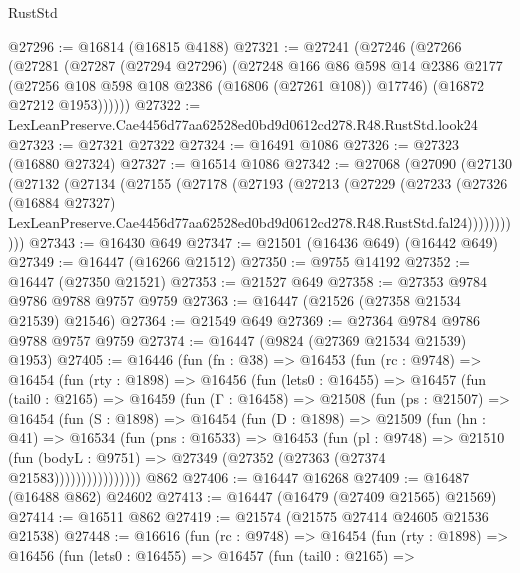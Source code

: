 \begin{lexlean}{RustStd}
\begin{coremodule}
@27296 := @16814 (@16815 @4188)
@27321 := @27241
    (@27246
      (@27266
        (@27281
          (@27287
            (@27294 @27296)
            (@27248
              @166
              @86
              @598
              @14
              @2386
              @2177
              (@27256 @108 @598 @108 @2386 (@16806 (@27261 @108)) @17746)
              (@16872 @27212 @1953))))))
@27322 := LexLeanPreserve.Cae4456d77aa62528ed0bd9d0612cd278.R48.RustStd.look24
@27323 := @27321 @27322
@27324 := @16491 @1086
@27326 := @27323 (@16880 @27324)
@27327 := @16514 @1086
@27342 := @27068
    (@27090
      (@27130
        (@27132
          (@27134
            (@27155
              (@27178
                (@27193
                  (@27213
                    (@27229
                      (@27233
                        (@27326
                          (@16884 @27327)
                          LexLeanPreserve.Cae4456d77aa62528ed0bd9d0612cd278.R48.RustStd.fal24)))))))))))
@27343 := @16430 @649
@27347 := @21501 (@16436 @649) (@16442 @649)
@27349 := @16447 (@16266 @21512)
@27350 := @9755 @14192
@27352 := @16447 (@27350 @21521)
@27353 := @21527 @649
@27358 := @27353 @9784 @9786 @9788 @9757 @9759
@27363 := @16447 (@21526 (@27358 @21534 @21539) @21546)
@27364 := @21549 @649
@27369 := @27364 @9784 @9786 @9788 @9757 @9759
@27374 := @16447 (@9824 (@27369 @21534 @21539) @1953)
@27405 := @16446
    (fun (fn : @38) =>
    @16453
      (fun (rc : @9748) =>
      @16454
        (fun (rty : @1898) =>
        @16456
          (fun (lets0 : @16455) =>
          @16457
            (fun (tail0 : @2165) =>
            @16459
              (fun (Γ : @16458) =>
              @21508
                (fun (ps : @21507) =>
                @16454
                  (fun (S : @1898) =>
                  @16454
                    (fun (D : @1898) =>
                    @21509
                      (fun (hn : @41) =>
                      @16534
                        (fun (pns : @16533) =>
                        @16453
                          (fun (pl : @9748) =>
                          @21510
                            (fun (bodyL : @9751) =>
                            @27349 (@27352 (@27363 (@27374 @21583))))))))))))))))
    @862
@27406 := @16447 @16268
@27409 := @16487 (@16488 @862) @24602
@27413 := @16447 (@16479 (@27409 @21565) @21569)
@27414 := @16511 @862
@27419 := @21574 (@21575 @27414 @24605 @21536 @21538)
@27448 := @16616
    (fun (rc : @9748) =>
    @16454
      (fun (rty : @1898) =>
      @16456
        (fun (lets0 : @16455) =>
        @16457
          (fun (tail0 : @2165) =>

\end{coremodule}
\end{lexlean}
